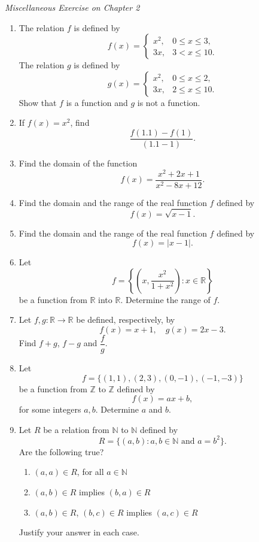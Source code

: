 \documentclass[11pt]{article}
\begin{document}
\vspace{0.8cm}
\newpage
\begin{center}
{\Large\color{cyan}\textit{Miscellaneous Exercise on Chapter 2}}
\end{center}

\vspace{0.5cm}

\begin{enumerate}

\item The relation $f$ is defined by
\[
f(x)=
\begin{cases}
x^2, & 0 \le x \le 3,\\
3x, & 3 < x \le 10.
\end{cases}
\]
The relation $g$ is defined by
\[
g(x)=
\begin{cases}
x^2, & 0 \le x \le 2,\\
3x, & 2 \le x \le 10.
\end{cases}
\]
Show that $f$ is a function and $g$ is not a function.

\item If $f(x)=x^2$, find
\[
\frac{f(1.1)-f(1)}{(1.1-1)}.
\]

\item Find the domain of the function
\[
f(x)=\frac{x^2+2x+1}{x^2-8x+12}.
\]

\item Find the domain and the range of the real function $f$ defined by
\[
f(x)=\sqrt{x-1}.
\]

\item Find the domain and the range of the real function $f$ defined by
\[
f(x)=|x-1|.
\]

\item Let
\[
f=\left\{\left(x,\frac{x^2}{1+x^2}\right):x\in \mathbb{R}\right\}
\]
be a function from $\mathbb{R}$ into $\mathbb{R}$. Determine the range of $f$.

\item Let $f,g:\mathbb{R}\to\mathbb{R}$ be defined, respectively, by
\[
f(x)=x+1,\quad g(x)=2x-3.
\]
Find $f+g$, $f-g$ and $\dfrac{f}{g}$.

\item Let
\[
f=\{(1,1),(2,3),(0,-1),(-1,-3)\}
\]
be a function from $\mathbb{Z}$ to $\mathbb{Z}$ defined by
\[
f(x)=ax+b,
\]
for some integers $a,b$. Determine $a$ and $b$.

\item Let $R$ be a relation from $\mathbb{N}$ to $\mathbb{N}$ defined by
\[
R=\{(a,b):a,b\in\mathbb{N}\text{ and }a=b^2\}.
\]
Are the following true?
\begin{enumerate}
\item $(a,a)\in R$, for all $a\in\mathbb{N}$
\item $(a,b)\in R$ implies $(b,a)\in R$
\item $(a,b)\in R$, $(b,c)\in R$ implies $(a,c)\in R$
\end{enumerate}
Justify your answer in each case.


\end{enumerate}
\end{document}
